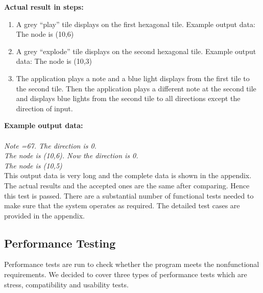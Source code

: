 \documentclass[10pt,a4paper]{article}
\begin{document}
\textbf{Actual result in steps:}
\begin{enumerate}
\item A grey “play” tile displays on the first hexagonal tile. Example output data: The node is (10,6)

\item A grey “explode” tile displays on the second hexagonal tile. Example output data: The node is (10,3)

\item The application plays a note and a blue light displays from the first tile to the second tile. Then the application plays a different note at the second tile and displays blue lights from the second tile to all directions except the direction of input.
\end{enumerate}

\noindent
\textbf{Example output data:} \\
\\
\emph{ Note =67.  The direction is 0. \\ The node is (10,6).  Now the direction is 0. \\ The node is (10,5)}\\

\noindent
This output data is very long and the complete data is shown in the appendix. The actual results and the accepted ones are the same after comparing. Hence this test is passed. There are a substantial number of functional tests needed to make sure that the system operates as required. The detailed test cases are provided in the appendix. 

\subsection{Performance Testing}
Performance tests are run to check whether the program meets the nonfunctional requirements. We decided to cover three types of performance tests which are stress, compatibility and usability tests. 
\end{document}
